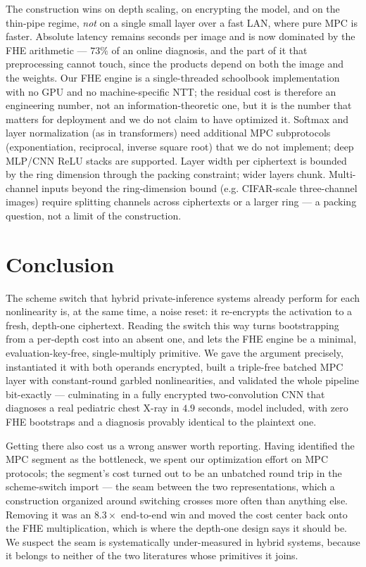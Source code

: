 \documentclass[11pt]{article}
\theoremstyle{plain}
\theoremstyle{definition}
\theoremstyle{remark}
\begin{document}
The construction wins on depth scaling, on encrypting the model, and on the
thin-pipe regime, \emph{not} on a single small layer over a fast LAN, where
pure MPC is faster. Absolute latency remains seconds per image and is now
dominated by the FHE arithmetic --- $73\%$ of an online diagnosis, and the
part of it that preprocessing cannot touch, since the products depend on both
the image and the weights. Our FHE engine is
a single-threaded schoolbook implementation with no GPU and no
machine-specific NTT; the residual cost is therefore an engineering number,
not an information-theoretic one, but it is the number that matters for
deployment and we do not claim to have optimized it.
Softmax and layer normalization (as in transformers) need additional MPC
subprotocols (exponentiation, reciprocal, inverse square root) that we do not
implement; deep MLP/CNN ReLU stacks are supported. Layer width per ciphertext
is bounded by the ring dimension through the packing constraint; wider layers
chunk. Multi-channel inputs beyond the ring-dimension bound (e.g. CIFAR-scale
three-channel images) require splitting channels across ciphertexts or a
larger ring --- a packing question, not a limit of the construction.

\section{Conclusion}\label{sec:conclusion}

The scheme switch that hybrid private-inference systems already perform for
each nonlinearity is, at the same time, a noise reset: it re-encrypts the
activation to a fresh, depth-one ciphertext. Reading the switch this way
turns bootstrapping from a per-depth cost into an absent one, and lets the
FHE engine be a minimal, evaluation-key-free, single-multiply primitive. We
gave the argument precisely, instantiated it with both operands encrypted,
built a triple-free batched MPC layer with constant-round garbled
nonlinearities, and validated the whole pipeline bit-exactly --- culminating
in a fully encrypted two-convolution CNN that diagnoses a real pediatric
chest X-ray in $4.9$ seconds, model included, with zero FHE bootstraps and a
diagnosis provably identical to the plaintext one.

Getting there also cost us a wrong answer worth reporting. Having identified
the MPC segment as the bottleneck, we spent our optimization effort on MPC
protocols; the segment's cost turned out to be an unbatched round trip in the
scheme-switch import --- the seam between the two representations, which a
construction organized around switching crosses more often than anything
else. Removing it was an $8.3\times$ end-to-end win and moved the cost center
back onto the FHE multiplication, which is where the depth-one design says it
should be. We suspect the seam is systematically under-measured in hybrid
systems, because it belongs to neither of the two literatures whose
primitives it joins.



\end{document}
